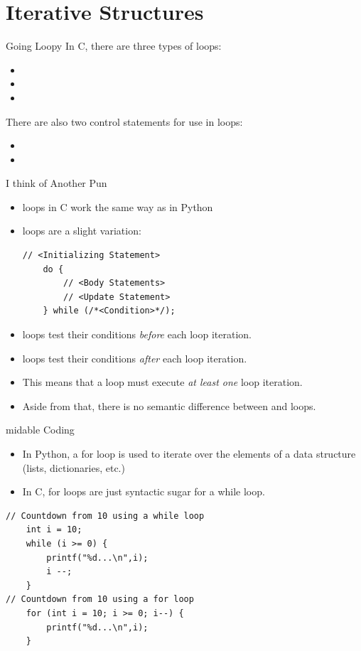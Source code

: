 \documentclass[11pt]{beamer}
\let\OldTexttt\texttt
\renewcommand{\texttt}[1]{\OldTexttt{\color{teal}{#1}}}
\begin{document}
\section[Loops]{Iterative Structures}
\begin{frame}{Going Loopy}
In C, there are three types of loops: 
\begin{itemize}
\item \texttt{while}
\item \texttt{do while}
\item \texttt{for}
\end{itemize}
There are also two control statements for use in loops:
\begin{itemize}
\item \texttt{break;}
\item \texttt{continue;}
\end{itemize}
\end{frame}

\begin{frame}[fragile=singleslide]{\texttt{do while} I think of Another Pun}
\begin{itemize}
\item \texttt{while} loops in C work the same way as in Python 
\item \texttt{do while} loops are a slight variation:
\begin{lstlisting}[style=C]
	// <Initializing Statement>
	do {
		// <Body Statements>
		// <Update Statement>
	} while (/*<Condition>*/); 
\end{lstlisting}
\item \texttt{while} loops test their conditions \emph{before} each loop iteration.
\item \texttt{do while} loops test their conditions \emph {after} each loop iteration.
\item This means that a \texttt{do while} loop must execute \emph{at least one} loop iteration.  
\item Aside from that, there is no semantic difference between \texttt{while} and \texttt{do while} loops.  
\end{itemize}
\end{frame}

\begin{frame}[fragile=singleslide]{\texttt{for}midable Coding}
\begin{itemize}
\item In Python, a for loop is used to iterate over the elements of a data structure (lists, dictionaries, etc.)
\item In C, for loops are just syntactic sugar for a while loop.
\end{itemize}
\begin{lstlisting}[style = C]
// Countdown from 10 using a while loop
	int i = 10;
	while (i >= 0) {
		printf("%d...\n",i);
		i --;
	}	
// Countdown from 10 using a for loop
	for (int i = 10; i >= 0; i--) {
		printf("%d...\n",i);
	}
\end{lstlisting}
\end{frame}
\end{document}
